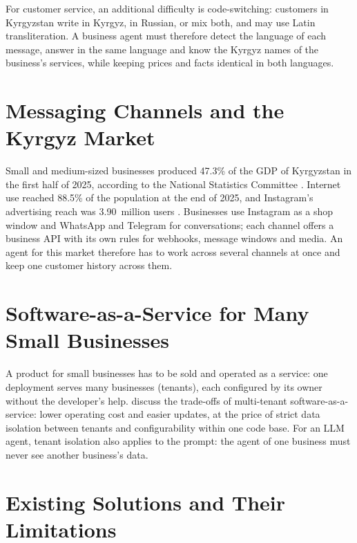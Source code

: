 For customer service, an additional difficulty is code-switching: customers in Kyrgyzstan write in Kyrgyz, in Russian, or
mix both, and may use Latin transliteration. A business agent must therefore detect the language of each message, answer
in the same language and know the Kyrgyz names of the business's services, while keeping prices and facts identical in
both languages.

\section{Messaging Channels and the Kyrgyz Market}

Small and medium-sized businesses produced 47.3\% of the GDP of Kyrgyzstan in the first half of 2025, according to the
National Statistics Committee \parencite{akchabar2025sme}. Internet use reached 88.5\% of the population at the end of
2025, and Instagram's advertising reach was 3.90~million users \parencite{datareportal2026kg}. Businesses use Instagram
as a shop window and WhatsApp and Telegram for conversations; each channel offers a business API with its own rules for
webhooks, message windows and media. An agent for this market therefore has to work across several channels at once and
keep one customer history across them.

\section{Software-as-a-Service for Many Small Businesses}

A product for small businesses has to be sold and operated as a service: one deployment serves many businesses
(tenants), each configured by its owner without the developer's help. \textcite{bezemer2010multi} discuss the
trade-offs of multi-tenant software-as-a-service: lower operating cost and easier updates, at the price of strict data
isolation between tenants and configurability within one code base. For an LLM agent, tenant isolation also applies to
the prompt: the agent of one business must never see another business's data.

\section{Existing Solutions and Their Limitations}

